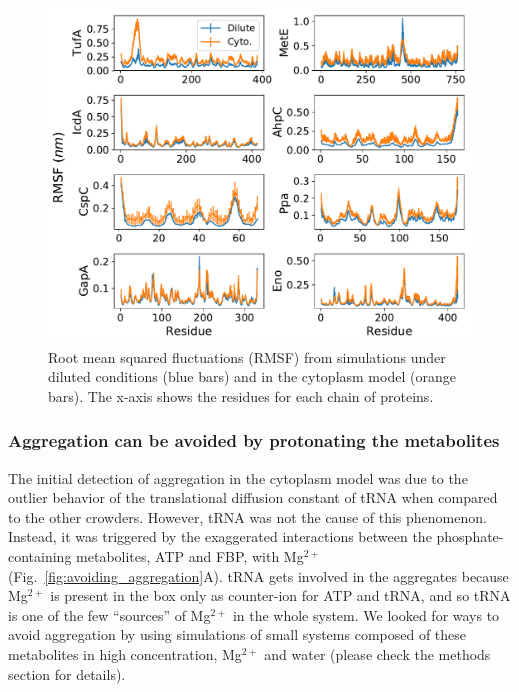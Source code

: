 \documentclass[journal=jpcisd8,manuscript=article]{achemso}
\begin{document}
\begin{figure}[H]
\includegraphics[scale=0.5]{rmsf.pdf}
\caption{Root mean squared fluctuations (RMSF) from simulations under
  diluted conditions (blue bars) and in the cytoplasm model (orange
  bars). The x-axis shows the residues for each chain of proteins.}
\label{fig:rmsf}
\end{figure}






\subsubsection{Aggregation can be avoided by protonating the metabolites}

The initial detection of aggregation in the cytoplasm model was due to
the outlier behavior of the translational diffusion constant of tRNA
when compared to the other crowders. However, tRNA was not the cause of this
phenomenon. Instead, it was triggered by the exaggerated interactions
between the phosphate-containing metabolites, ATP and FBP, with
Mg$^{2+}$ (Fig.~\ref{fig:avoiding_aggregation}A). tRNA gets involved
in the aggregates because Mg$^{2+}$ is present in the box only as
counter-ion for ATP and tRNA, and so tRNA is one of the few
``sources'' of Mg$^{2+}$ in the whole system. We looked for ways to
avoid aggregation by using simulations of small systems composed of
these metabolites in high concentration, Mg$^{2+}$ and water (please
check the methods section for details).
\end{document}
